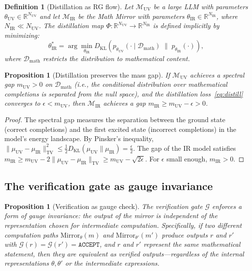 \documentclass[11pt,a4paper]{article}
\newtheorem{proposition}[theorem]{Proposition}
\newtheorem{definition}[theorem]{Definition}
\newcommand{\R}{\mathbb{R}}
\newcommand{\cM}{\mathcal{M}}
\newcommand{\cD}{\mathcal{D}}
\newcommand{\cG}{\mathcal{G}}
\newcommand{\DKL}{D_{\mathrm{KL}}}
\newcommand{\Mirror}{\mathrm{Mirror}}
\begin{document}
\begin{definition}[Distillation as RG flow]\label{def:distill}
Let $\cM_{\text{UV}}$ be a large LLM with parameters
$\theta_{\text{UV}} \in \R^{N_{\text{UV}}}$ and let
$\cM_{\text{IR}}$ be the Math Mirror with parameters
$\theta_{\text{IR}} \in \R^{N_{\text{IR}}}$,
where $N_{\text{IR}} \ll N_{\text{UV}}$.
The distillation map
$\Phi : \R^{N_{\text{UV}}} \to \R^{N_{\text{IR}}}$
is defined implicitly by minimizing:
\begin{equation}\label{eq:distill}
\theta_{\text{IR}}^* = \arg\min_{\theta_{\text{IR}}}
  \DKL\!\left(p_{\theta_{\text{UV}}}(\cdot \mid \cD_{\text{math}})
  \;\|\; p_{\theta_{\text{IR}}}(\cdot)\right),
\end{equation}
where $\cD_{\text{math}}$ restricts the distribution to
mathematical content.
\end{definition}

\begin{proposition}[Distillation preserves the mass gap]\label{prop:distill-gap}
If $\cM_{\text{UV}}$ achieves a spectral gap $m_{\text{UV}} > 0$
on $\cD_{\text{math}}$
(i.e., the conditional distribution over mathematical
completions is separated from the null space),
and the distillation loss~\eqref{eq:distill} converges
to $\epsilon < m_{\text{UV}}$,
then $\cM_{\text{IR}}$ achieves a gap
$m_{\text{IR}} \geq m_{\text{UV}} - \epsilon > 0$.
\end{proposition}

\begin{proof}
The spectral gap measures the separation between the
ground state (correct completions) and the first excited
state (incorrect completions) in the model's energy landscape.
By Pinsker's inequality,
$\|\mu_{\text{UV}} - \mu_{\text{IR}}\|_{\text{TV}}^2
\leq \frac{1}{2}\DKL(\mu_{\text{UV}} \| \mu_{\text{IR}})
= \frac{\epsilon}{2}$.
The gap of the IR model satisfies
$m_{\text{IR}} \geq m_{\text{UV}} - 2\|\mu_{\text{UV}} -
\mu_{\text{IR}}\|_{\text{TV}} \geq m_{\text{UV}} -
\sqrt{2\epsilon}$.
For $\epsilon$ small enough,
$m_{\text{IR}} > 0$.
\end{proof}

\subsection{The verification gate as gauge invariance}

\begin{proposition}[Verification as gauge check]\label{prop:gauge-inv}
The verification gate $\cG$ enforces a form of gauge invariance:
the output of the mirror is independent of the representation
chosen for intermediate computation.
Specifically, if two different computation paths
$\Mirror_\theta(m)$ and $\Mirror_{\theta'}(m')$ produce
outputs $r$ and $r'$ with $\cG(r) = \cG(r') = \texttt{ACCEPT}$,
and $r$ and $r'$ represent the same mathematical statement,
then they are equivalent as verified outputs---regardless of the
internal representations $\theta, \theta'$ or the intermediate
expressions.
\end{proposition}
\end{document}
